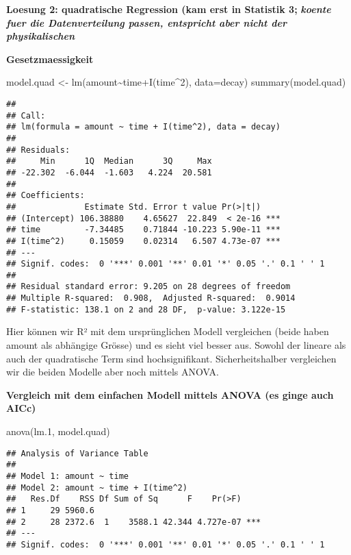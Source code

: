 \documentclass[
]{article}
\newenvironment{Shaded}{\begin{snugshade}}{\end{snugshade}}
\newcommand{\AttributeTok}[1]{\textcolor[rgb]{0.77,0.63,0.00}{#1}}
\newcommand{\DecValTok}[1]{\textcolor[rgb]{0.00,0.00,0.81}{#1}}
\newcommand{\FloatTok}[1]{\textcolor[rgb]{0.00,0.00,0.81}{#1}}
\newcommand{\FunctionTok}[1]{\textcolor[rgb]{0.00,0.00,0.00}{#1}}
\newcommand{\NormalTok}[1]{#1}
\newcommand{\OtherTok}[1]{\textcolor[rgb]{0.56,0.35,0.01}{#1}}
\newcommand{\SpecialCharTok}[1]{\textcolor[rgb]{0.00,0.00,0.00}{#1}}
\begin{document}
\textbf{Loesung 2: quadratische Regression (kam erst in Statistik 3;}
\emph{\textbf{koente fuer die Datenverteilung passen, entspricht aber
nicht der physikalischen}}

\textbf{Gesetzmaessigkeit}

\begin{Shaded}
\begin{Highlighting}[]
\NormalTok{model.quad }\OtherTok{\textless{}{-}} \FunctionTok{lm}\NormalTok{(amount}\SpecialCharTok{\textasciitilde{}}\NormalTok{time}\SpecialCharTok{+}\FunctionTok{I}\NormalTok{(time}\SpecialCharTok{\^{}}\DecValTok{2}\NormalTok{), }\AttributeTok{data=}\NormalTok{decay)}
\FunctionTok{summary}\NormalTok{(model.quad)}
\end{Highlighting}
\end{Shaded}

\begin{verbatim}
## 
## Call:
## lm(formula = amount ~ time + I(time^2), data = decay)
## 
## Residuals:
##     Min      1Q  Median      3Q     Max 
## -22.302  -6.044  -1.603   4.224  20.581 
## 
## Coefficients:
##              Estimate Std. Error t value Pr(>|t|)    
## (Intercept) 106.38880    4.65627  22.849  < 2e-16 ***
## time         -7.34485    0.71844 -10.223 5.90e-11 ***
## I(time^2)     0.15059    0.02314   6.507 4.73e-07 ***
## ---
## Signif. codes:  0 '***' 0.001 '**' 0.01 '*' 0.05 '.' 0.1 ' ' 1
## 
## Residual standard error: 9.205 on 28 degrees of freedom
## Multiple R-squared:  0.908,  Adjusted R-squared:  0.9014 
## F-statistic: 138.1 on 2 and 28 DF,  p-value: 3.122e-15
\end{verbatim}

Hier können wir R² mit dem ursprünglichen Modell vergleichen (beide
haben amount als abhängige Grösse) und es sieht viel besser aus. Sowohl
der lineare als auch der quadratische Term sind hochsignifikant.
Sicherheitshalber vergleichen wir die beiden Modelle aber noch mittels
ANOVA.

\textbf{Vergleich mit dem einfachen Modell mittels ANOVA (es ginge auch
AICc)}

\begin{Shaded}
\begin{Highlighting}[]
\FunctionTok{anova}\NormalTok{(lm}\FloatTok{.1}\NormalTok{, model.quad)}
\end{Highlighting}
\end{Shaded}

\begin{verbatim}
## Analysis of Variance Table
## 
## Model 1: amount ~ time
## Model 2: amount ~ time + I(time^2)
##   Res.Df    RSS Df Sum of Sq      F    Pr(>F)    
## 1     29 5960.6                                  
## 2     28 2372.6  1    3588.1 42.344 4.727e-07 ***
## ---
## Signif. codes:  0 '***' 0.001 '**' 0.01 '*' 0.05 '.' 0.1 ' ' 1
\end{verbatim}
\end{document}
